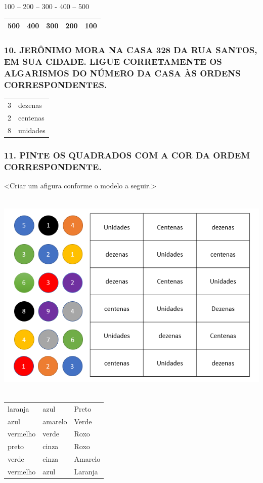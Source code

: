 100 -- 200 -- 300 - 400 -- 500

\begin{longtable}[]{@{}lllll@{}}
\toprule
500 & 400 & 300 & 200 & 100\tabularnewline
\bottomrule
\end{longtable}

\subsubsection{10. JERÔNIMO MORA NA CASA 328 DA RUA SANTOS, EM SUA
CIDADE. LIGUE CORRETAMENTE OS ALGARISMOS DO NÚMERO DA CASA ÀS ORDENS
CORRESPONDENTES.}\label{jeruxf4nimo-mora-na-casa-328-da-rua-santos-em-sua-cidade.-ligue-corretamente-os-algarismos-do-nuxfamero-da-casa-uxe0s-ordens-correspondentes}

\begin{longtable}[]{@{}ll@{}}
\toprule
3 & dezenas\tabularnewline
2 & centenas\tabularnewline
8 & unidades\tabularnewline
\bottomrule
\end{longtable}

\subsubsection{11. PINTE OS QUADRADOS COM A COR DA ORDEM CORRESPONDENTE.
}\label{pinte-os-quadrados-com-a-cor-da-ordem-correspondente}

\textless{}Criar um afigura conforme o modelo a seguir.\textgreater{}

\includegraphics[width=5.90556in,height=4.02083in]{media/image8.png}

\begin{longtable}[]{@{}lll@{}}
\toprule
laranja & azul & Preto\tabularnewline
azul & amarelo & Verde\tabularnewline
vermelho & verde & Roxo\tabularnewline
preto & cinza & Roxo\tabularnewline
verde & cinza & Amarelo\tabularnewline
vermelho & azul & Laranja\tabularnewline
\bottomrule
\end{longtable}

